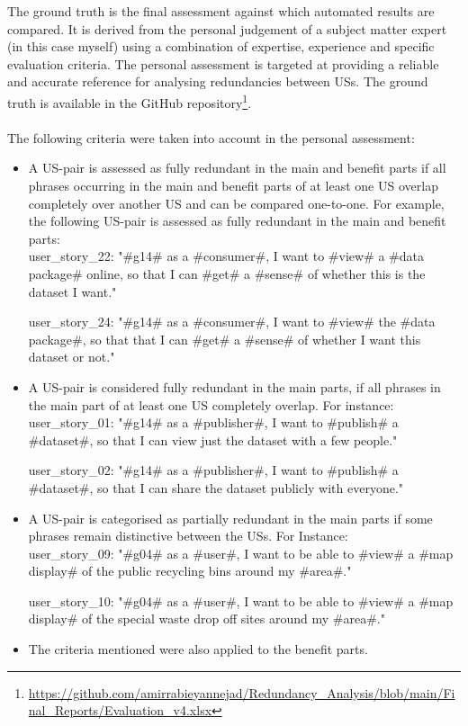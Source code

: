 The ground truth is the final assessment against which automated results are compared. It is derived from the personal judgement of a subject matter expert (in this case myself) using a combination of expertise, experience and specific evaluation criteria. The personal assessment is targeted at providing a reliable and accurate reference for analysing redundancies between USs. The ground truth is available in the GitHub repository\footnote{\href{https://github.com/amirrabieyannejad/Redundancy_Analysis/blob/main/Final_Reports/Evaluation_v4.xlsx}{https://github.com/amirrabieyannejad/Redundancy\_Analysis/blob/main/Final\_Reports/Evaluation\_v4.xlsx}}.\\\\
	The following criteria were taken into account in the personal assessment:
	\begin{itemize}
		\item A US-pair is assessed as fully redundant in the main and benefit parts if all phrases occurring in the main and benefit parts of at least one US overlap completely over another US and can be compared one-to-one. For example, the following US-pair is assessed as fully redundant in the main and benefit parts:\\
		user\_story\_22: "\#g14\# as a \#consumer\#, I want to \#view\# a \#data package\# online, so that I can \#get\# a \#sense\# of whether this is the dataset I want."
		
		user\_story\_24: "\#g14\# as a \#consumer\#, I want to \#view\# the \#data package\#, so that that I can \#get\# a \#sense\# of whether I want this dataset or not."
		
		\item A US-pair is considered fully redundant in the main parts, if all phrases in the main part of at least one US completely overlap. For instance:\\
		user\_story\_01: "\#g14\# as a \#publisher\#, I want to \#publish\# a \#dataset\#, so that I can view just the dataset with a few people."
		
		user\_story\_02: "\#g14\# as a \#publisher\#, I want to \#publish\# a \#dataset\#, so that I can share the dataset publicly with everyone."
		
		\item A US-pair is categorised as partially redundant in the main parts if some phrases remain distinctive between the USs. For Instance:\\
		user\_story\_09: "\#g04\# as a \#user\#, I want to be able to \#view\# a \#map display\# of the public recycling bins around my \#area\#."
		
		user\_story\_10: "\#g04\# as a \#user\#, I want to be able to \#view\# a \#map display\# of the special waste drop off sites around my \#area\#."
		
		\item The criteria mentioned were also applied to the benefit parts.
	\end{itemize}
